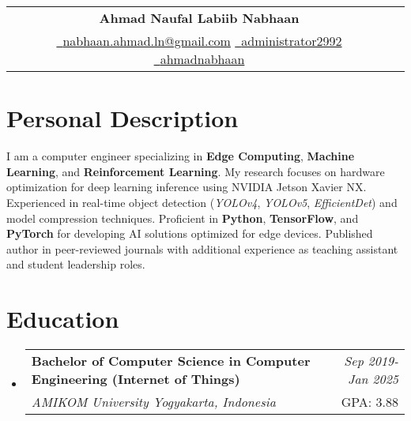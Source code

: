 \documentclass[a4paper,11pt]{article}
\makeatletter
\newcommand{\resumeSubheading}[4]{
\vspace{0.5mm}\item
    \begin{tabular*}{0.98\textwidth}[t]{l@{\extracolsep{\fill}}r}
        \textbf{#1} & \textit{\footnotesize{#4}} \\
        \textit{\footnotesize{#3}} &  \footnotesize{#2}\\
    \end{tabular*}
    \vspace{-2.4mm}
}
\newcommand{\resumeSubHeadingListStart}{\begin{itemize}[leftmargin=*,labelsep=0mm]}
\newcommand{\resumeSubHeadingListEnd}{\end{itemize}\vspace{2mm}}
\newcommand{\name}{Ahmad Naufal Labiib Nabhaan} %
\newcommand{\emaila}{nabhaan.ahmad.ln@gmail.com} %
\makeatother
\begin{document}
\selectfont

{
\begin{center}
\begin{tabularx}{\linewidth}{C r} %
  \\
  \textbf{\Huge \name} \\ %
  \href{mailto:\emaila}{\raisebox{0.0\height}{\footnotesize \faEnvelope}\ {\emaila}} \href{https://github.com/administrator2992}{\raisebox{0.0\height}{\footnotesize \faGithub}\ {administrator2992}} \href{https://linkedin.com/in/ahmadnabhaan/}{\raisebox{0.0\height}{\footnotesize \faLinkedin}\ {ahmadnabhaan}}
\end{tabularx}
\end{center}

}

\section{\textbf{Personal Description}}
\begin{adjustwidth}{0mm}{0mm}
  \justifying  %
  \setlength{\parindent}{0pt}  %
  \setlength{\parskip}{2pt}    %
  
  I am a computer engineer specializing in \textbf{Edge Computing}, \textbf{Machine Learning}, and \textbf{Reinforcement Learning}. My research focuses on hardware optimization for deep learning inference using NVIDIA Jetson Xavier NX. Experienced in real-time object detection (\textit{YOLOv4}, \textit{YOLOv5}, \textit{EfficientDet}) and model compression techniques. Proficient in \textbf{Python}, \textbf{TensorFlow}, and \textbf{PyTorch} for developing AI solutions optimized for edge devices. Published author in peer-reviewed journals with additional experience as teaching assistant and student leadership roles.
  
  \end{adjustwidth}
\vspace{-2.5mm}

\section{\textbf{Education}}
  \resumeSubHeadingListStart
    \resumeSubheading
      {Bachelor of Computer Science in Computer Engineering (Internet of Things)}{GPA: 3.88}
      {AMIKOM University Yogyakarta, Indonesia}{Sep 2019- Jan 2025}
  \resumeSubHeadingListEnd
\vspace{-2.5mm}
%
\end{document}
